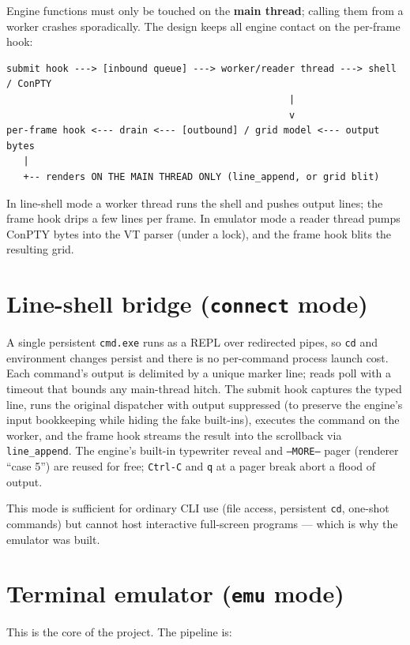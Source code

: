 \documentclass[11pt]{article}
\newcommand{\ic}[1]{\texttt{#1}}
\begin{document}
Engine functions must only be touched on the \textbf{main thread}; calling them from
a worker crashes sporadically. The design keeps all engine contact on the per-frame
hook:

\begin{lstlisting}
submit hook ---> [inbound queue] ---> worker/reader thread ---> shell / ConPTY
                                                  |
                                                  v
per-frame hook <--- drain <--- [outbound] / grid model <--- output bytes
   |
   +-- renders ON THE MAIN THREAD ONLY (line_append, or grid blit)
\end{lstlisting}

\noindent
In line-shell mode a worker thread runs the shell and pushes output lines; the frame
hook drips a few lines per frame. In emulator mode a reader thread pumps ConPTY bytes
into the VT parser (under a lock), and the frame hook blits the resulting grid.

\section{Line-shell bridge (\texttt{connect} mode)}

A single persistent \texttt{cmd.exe} runs as a REPL over redirected pipes, so
\texttt{cd} and environment changes persist and there is no per-command process
launch cost. Each command's output is delimited by a unique marker line; reads poll
with a timeout that bounds any main-thread hitch. The submit hook captures the typed
line, runs the original dispatcher with output suppressed (to preserve the engine's
input bookkeeping while hiding the fake built-ins), executes the command on the
worker, and the frame hook streams the result into the scrollback via
\texttt{line_append}. The engine's built-in typewriter reveal and \ic{--MORE--} pager
(renderer ``case 5'') are reused for free; \texttt{Ctrl-C} and \texttt{q} at a pager
break abort a flood of output.

This mode is sufficient for ordinary CLI use (file access, persistent \texttt{cd},
one-shot commands) but cannot host interactive full-screen programs --- which is why
the emulator was built.

\section{Terminal emulator (\texttt{emu} mode)}

This is the core of the project. The pipeline is:
\end{document}
